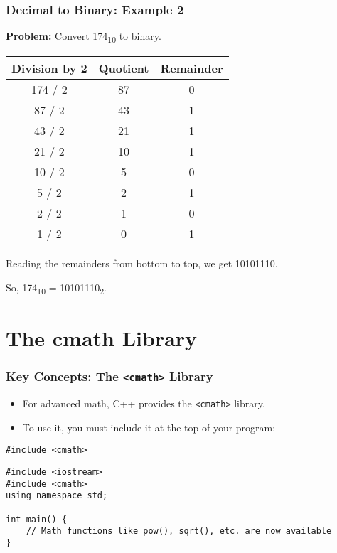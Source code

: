 \documentclass{beamer}
\begin{document}
\begin{frame}
\frametitle{Decimal to Binary: Example 2}
\textbf{Problem:} Convert 174\textsubscript{10} to binary.

\begin{center}
\begin{tabular}{c|c|c}
\textbf{Division by 2} & \textbf{Quotient} & \textbf{Remainder} \\
\hline
174 / 2 & 87 & \alert{0} \\
87 / 2  & 43 & \alert{1} \\
43 / 2  & 21 & \alert{1} \\
21 / 2  & 10 & \alert{1} \\
10 / 2  & 5  & \alert{0} \\
5 / 2   & 2  & \alert{1} \\
2 / 2   & 1  & \alert{0} \\
1 / 2   & 0  & \alert{1} \\
\end{tabular}
\end{center}
\vfill
Reading the remainders from bottom to top, we get \alert{10101110}.

\vfill
So, 174\textsubscript{10} = 10101110\textsubscript{2}.
\end{frame}

\section{The cmath Library}

\begin{frame}[fragile]
\frametitle{Key Concepts: The \texttt{<cmath>} Library}
\begin{itemize}
    \item For advanced math, C++ provides the \texttt{<cmath>} library.
    \item To use it, you must include it at the top of your program:
\end{itemize}
\begin{block}{\texttt{\#include <cmath>}}
\begin{verbatim}
#include <iostream>
#include <cmath>
using namespace std;

int main() {
    // Math functions like pow(), sqrt(), etc. are now available
}
\end{verbatim}
\end{block}
\end{frame}
\end{document}
